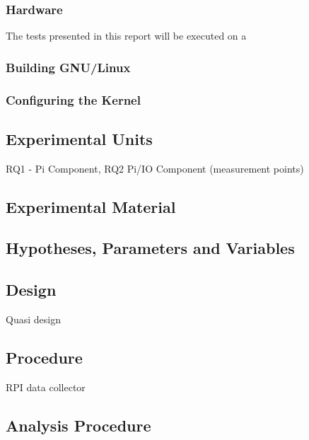 \subsubsection{Hardware}
The tests presented in this report will be executed on a




\subsubsection{Building GNU/Linux}
\subsubsection{Configuring the Kernel}

\subsection{Experimental Units}
RQ1 - Pi Component, RQ2 Pi/IO Component (measurement points)

\subsection{Experimental Material}

\subsection{Hypotheses, Parameters and Variables}


\subsection{Design}
Quasi design


\subsection{Procedure}
RPI data collector 

\subsection{Analysis Procedure}
